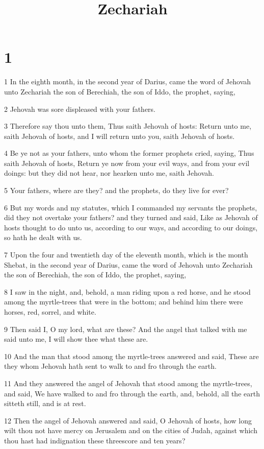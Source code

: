 

\title{Zechariah}

\chapter{1}

\par 1 In the eighth month, in the second year of Darius, came the word of Jehovah unto Zechariah the son of Berechiah, the son of Iddo, the prophet, saying,
\par 2 Jehovah was sore displeased with your fathers.
\par 3 Therefore say thou unto them, Thus saith Jehovah of hosts: Return unto me, saith Jehovah of hosts, and I will return unto you, saith Jehovah of hosts.
\par 4 Be ye not as your fathers, unto whom the former prophets cried, saying, Thus saith Jehovah of hosts, Return ye now from your evil ways, and from your evil doings: but they did not hear, nor hearken unto me, saith Jehovah.
\par 5 Your fathers, where are they? and the prophets, do they live for ever?
\par 6 But my words and my statutes, which I commanded my servants the prophets, did they not overtake your fathers? and they turned and said, Like as Jehovah of hosts thought to do unto us, according to our ways, and according to our doings, so hath he dealt with us.
\par 7 Upon the four and twentieth day of the eleventh month, which is the month Shebat, in the second year of Darius, came the word of Jehovah unto Zechariah the son of Berechiah, the son of Iddo, the prophet, saying,
\par 8 I saw in the night, and, behold, a man riding upon a red horse, and he stood among the myrtle-trees that were in the bottom; and behind him there were horses, red, sorrel, and white.
\par 9 Then said I, O my lord, what are these? And the angel that talked with me said unto me, I will show thee what these are.
\par 10 And the man that stood among the myrtle-trees answered and said, These are they whom Jehovah hath sent to walk to and fro through the earth.
\par 11 And they answered the angel of Jehovah that stood among the myrtle-trees, and said, We have walked to and fro through the earth, and, behold, all the earth sitteth still, and is at rest.
\par 12 Then the angel of Jehovah answered and said, O Jehovah of hosts, how long wilt thou not have mercy on Jerusalem and on the cities of Judah, against which thou hast had indignation these threescore and ten years?
